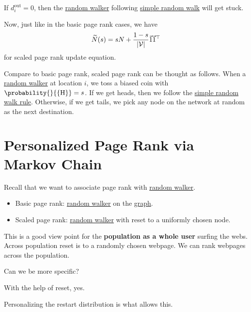 \begin{note}
	If \(d_i^{\text{out}} = 0\), then the \hyperref[def:random-walker]{random walker} following \hyperref[def:simple-random-walk]{simple random walk}
	will get stuck.
\end{note}

Now, just like in the basic page rank cases, we have
\[
	\widetilde{N} (s) = s N + \frac{1-s}{\left\vert \mathcal{\MakeUppercase{v}}  \right\vert }\vec{1} \vec{1} ^{\top}
\]
for scaled page rank update equation.

\begin{intuition}
	Compare to basic page rank, scaled page rank can be thought as follows. When a \hyperref[def:random-walker]{random walker}
	at location \(i\), we toss a biased coin with \(\probability{}{\{\mathrm{H} \}} = s\). If we get heads, then we follow
	the \hyperref[def:simple-random-walk]{simple random walk rule}. Otherwise,
	if we get tails, we pick any node on the network at random as the next destination.
\end{intuition}

\section{Personalized Page Rank via Markov Chain}
\begin{prev}
	Recall that we want to associate page rank with \hyperref[def:random-walker]{random walker}.
	\begin{itemize}
		\item Basic page rank: \hyperref[def:random-walker]{random walker} on the \hyperref[def:graph]{graph}.
		\item Scaled page rank: \hyperref[def:random-walker]{random walker} with reset to a uniformly chosen node.
	\end{itemize}
\end{prev}
This is a good view point for the \textbf{population as a whole user} surfing the webs. Across population reset is to a randomly chosen webpage.
We can rank webpages across the population.

\begin{problem}
Can we be more specific?
\end{problem}
\begin{answer}
	With the help of reset, yes.
	\begin{remark}
		Personalizing the restart distribution is what allows this.
	\end{remark}
\end{answer}

